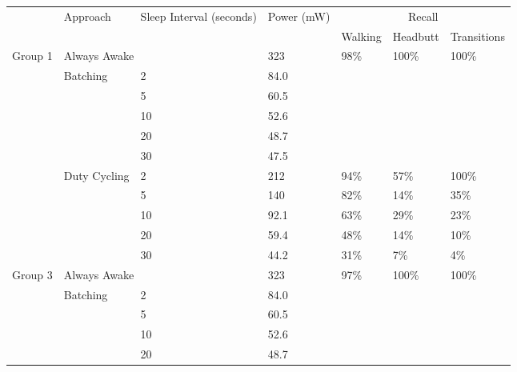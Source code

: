 \begin{table*}[t]
    \begin{tabular}{|l|l|l|l|l|l|l|}
    \hline
	\multirow{2}{*}{~}			& \multirow{2}{*}{Approach}		& \multirow{2}{*}{\parbox{2.2cm}{Sleep Interval (seconds)}}	
																			& \multirow{2}{*}{\parbox{1.2cm}{Power (mW)}} 
																						& \multicolumn{3}{c|}{Recall} 													\\ \cline{5-7}
								&								&			&			& Walking				& Headbutt					& Transitions 				\\ \hline
	\multirow{11}{*}{Group 1}	& \multicolumn{2}{l|}{Always Awake}			& 323		& \multirow{6}{*}{98\%}	& \multirow{6}{*}{100\%}	& \multirow{6}{*}{100\%}	\\ \cline{2-4}
								& \multirow{5}{*}{Batching}		& 2			& 84.0		&						&							&							\\ \cline{3-4}
								& 								& 5			& 60.5		&						&							&							\\ \cline{3-4}
								& 								& 10		& 52.6		&						&							&							\\ \cline{3-4}
								& 								& 20		& 48.7		&						&							&							\\ \cline{3-4}
								& 								& 30		& 47.5		&						&							&							\\ \cline{2-7}
								& \multirow{5}{*}{Duty Cycling}	& 2			& 212		& 94\%					& 57\%						& 100\%						\\ \cline{3-7}
								& 								& 5			& 140		& 82\%					& 14\%						& 35\%						\\ \cline{3-7}
								& 								& 10		& 92.1		& 63\%					& 29\%						& 23\%						\\ \cline{3-7}
								& 								& 20		& 59.4		& 48\%					& 14\%						& 10\%						\\ \cline{3-7}
								& 								& 30		& 44.2		& 31\%					& 7\%						& 4\%						\\ \hline
	\multirow{11}{*}{Group 3}	& \multicolumn{2}{l|}{Always Awake}			& 323		& \multirow{6}{*}{97\%}	& \multirow{6}{*}{100\%}	& \multirow{6}{*}{100\%}	\\ \cline{2-4}
								& \multirow{5}{*}{Batching}		& 2			& 84.0		&						&							&							\\ \cline{3-4}
								& 								& 5			& 60.5		&						&							&							\\ \cline{3-4}
								& 								& 10		& 52.6		&						&							&							\\ \cline{3-4}
								& 								& 20		& 48.7		&						&							&							\\ \cline{3-4}

\end{tabular}
\end{table*}
